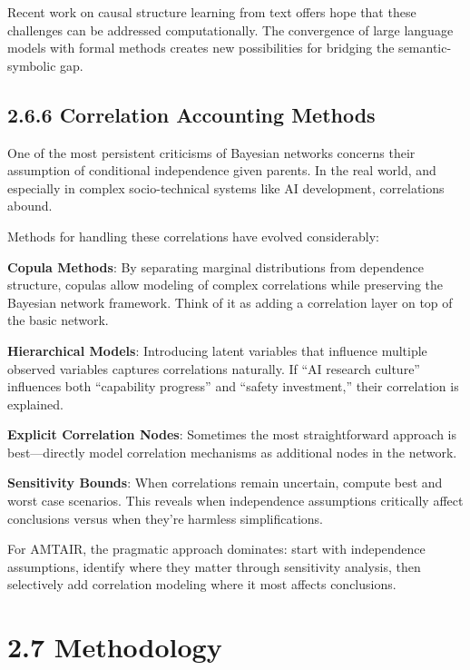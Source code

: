\documentclass[
  11pt,
  letterpaper,
]{book}
\begin{document}
Recent work on causal structure learning from text
\textcite{babakov2025} \textcite{ban2023} \textcite{bethard2007} offers
hope that these challenges can be addressed computationally. The
convergence of large language models with formal methods creates new
possibilities for bridging the semantic-symbolic gap.

\subsection{2.6.6 Correlation Accounting
Methods}\label{sec-correlation-methods}

One of the most persistent criticisms of Bayesian networks concerns
their assumption of conditional independence given parents. In the real
world, and especially in complex socio-technical systems like AI
development, correlations abound.

Methods for handling these correlations have evolved considerably:

\textbf{Copula Methods}: By separating marginal distributions from
dependence structure, copulas \textcite{nelson2006} allow modeling of
complex correlations while preserving the Bayesian network framework.
Think of it as adding a correlation layer on top of the basic network.

\textbf{Hierarchical Models}: Introducing latent variables that
influence multiple observed variables captures correlations naturally.
If ``AI research culture'' influences both ``capability progress'' and
``safety investment,'' their correlation is explained.

\textbf{Explicit Correlation Nodes}: Sometimes the most straightforward
approach is best---directly model correlation mechanisms as additional
nodes in the network.

\textbf{Sensitivity Bounds}: When correlations remain uncertain, compute
best and worst case scenarios. This reveals when independence
assumptions critically affect conclusions versus when they're harmless
simplifications.

For AMTAIR, the pragmatic approach dominates: start with independence
assumptions, identify where they matter through sensitivity analysis,
then selectively add correlation modeling where it most affects
conclusions.

\section{2.7 Methodology}\label{sec-methodology}
\end{document}
